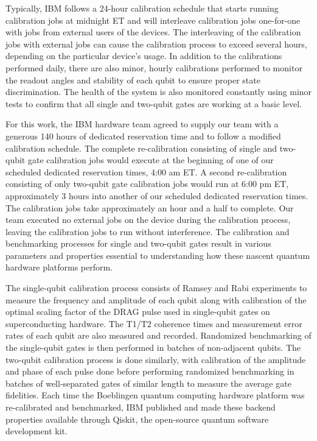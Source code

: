 \begin{appendix}
Typically, IBM follows a 24-hour calibration schedule that starts running calibration jobs at midnight ET and will interleave calibration jobs one-for-one with jobs from external users of the devices. The interleaving of the calibration jobs with external jobs can cause the calibration process to exceed several hours, depending on the particular device’s usage. In addition to the calibrations performed daily, there are also minor, hourly calibrations performed to monitor the readout angles and stability of each qubit to ensure proper state discrimination. The health of the system is also monitored constantly using minor tests to confirm that all single and two-qubit gates are working at a basic level. 

For this work, the IBM hardware team agreed to supply our team with a generous 140 hours of dedicated reservation time and to follow a modified calibration schedule. The complete re-calibration consisting of single and two-qubit gate calibration jobs would execute at the beginning of one of our scheduled dedicated reservation times, 4:00 am ET. A second re-calibration consisting of only two-qubit gate calibration jobs would run at 6:00 pm ET, approximately 3 hours into another of our scheduled dedicated reservation times. The calibration jobs take approximately an hour and a half to complete. Our team executed no external jobs on the device during the calibration process, leaving the calibration jobs to run without interference. The calibration and benchmarking processes for single and two-qubit gates result in various parameters and properties essential to understanding how these nascent quantum hardware platforms perform.

The single-qubit calibration process consists of Ramsey and Rabi experiments to measure the frequency and amplitude of each qubit along with calibration of the optimal scaling factor of the DRAG pulse used in single-qubit gates on superconducting hardware. The T1/T2 coherence times and measurement error rates of each qubit are also measured and recorded. Randomized benchmarking of the single-qubit gates is then performed in batches of non-adjacent qubits. The two-qubit calibration process is done similarly, with calibration of the amplitude and phase of each pulse done before performing randomized benchmarking in batches of well-separated gates of similar length to measure the average gate fidelities. Each time the Boeblingen quantum computing hardware platform was re-calibrated and benchmarked, IBM published and made these backend properties available through Qiskit, the open-source quantum software development kit. 
\end{appendix}